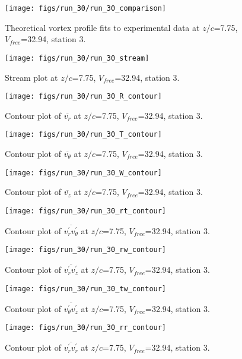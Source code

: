 \begin{figure}[H]
\centering
\texttt{[image: figs/run\_30/run\_30\_comparison]}
\caption{Theoretical vortex profile fits to experimental data at $z/c$=7.75, $V_{free}$=32.94, station 3.}
\end{figure}


\begin{figure}[H]
\centering
\texttt{[image: figs/run\_30/run\_30\_stream]}
\caption{Stream plot at $z/c$=7.75, $V_{free}$=32.94, station 3.}
\end{figure}


\begin{figure}[H]
\centering
\texttt{[image: figs/run\_30/run\_30\_R\_contour]}
\caption{Contour plot of $\overline{v_{r}}$ at $z/c$=7.75, $V_{free}$=32.94, station 3.}
\end{figure}


\begin{figure}[H]
\centering
\texttt{[image: figs/run\_30/run\_30\_T\_contour]}
\caption{Contour plot of $\overline{v_{\theta}}$ at $z/c$=7.75, $V_{free}$=32.94, station 3.}
\end{figure}


\begin{figure}[H]
\centering
\texttt{[image: figs/run\_30/run\_30\_W\_contour]}
\caption{Contour plot of $\overline{v_{z}}$ at $z/c$=7.75, $V_{free}$=32.94, station 3.}
\end{figure}


\begin{figure}[H]
\centering
\texttt{[image: figs/run\_30/run\_30\_rt\_contour]}
\caption{Contour plot of $\overline{v_{r}^{\prime} v_{\theta}^{\prime}}$ at $z/c$=7.75, $V_{free}$=32.94, station 3.}
\end{figure}


\begin{figure}[H]
\centering
\texttt{[image: figs/run\_30/run\_30\_rw\_contour]}
\caption{Contour plot of $\overline{v_{r}^{\prime} v_{z}^{\prime}}$ at $z/c$=7.75, $V_{free}$=32.94, station 3.}
\end{figure}


\begin{figure}[H]
\centering
\texttt{[image: figs/run\_30/run\_30\_tw\_contour]}
\caption{Contour plot of $\overline{v_{\theta}^{\prime} v_{z}^{\prime}}$ at $z/c$=7.75, $V_{free}$=32.94, station 3.}
\end{figure}


\begin{figure}[H]
\centering
\texttt{[image: figs/run\_30/run\_30\_rr\_contour]}
\caption{Contour plot of $\overline{v_{r}^{\prime} v_{r}^{\prime}}$ at $z/c$=7.75, $V_{free}$=32.94, station 3.}
\end{figure}


